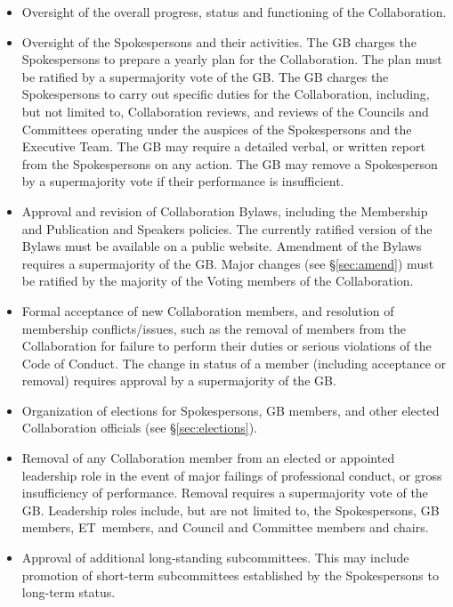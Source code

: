 \documentclass[12pt]{article}
\newcommand{\exec}{{Executive Team}}
\newcommand{\shorte}{{ET}}  %
\begin{document}
\begin{itemize}
\item Oversight of the overall progress, status and functioning of the Collaboration.

\item Oversight of the Spokespersons and their activities.  The GB charges the Spokespersons to prepare a yearly plan for the Collaboration.  The plan must be ratified by a supermajority vote of the GB.  The GB charges the Spokespersons to carry out specific duties for the Collaboration, including, but not limited to, Collaboration reviews, and reviews of the Councils and Committees operating under the auspices of the Spokespersons and the \exec.  The GB may require a detailed verbal, or written report from the Spokespersons on any action. The GB may remove a Spokesperson by a supermajority vote if their performance is insufficient.

\item Approval and revision of Collaboration Bylaws, including the Membership and Publication and Speakers policies. The currently ratified version of the Bylaws must be available on a public website. Amendment of the Bylaws requires a supermajority of the GB.  Major changes (see \S\ref{sec:amend}) must be ratified by the majority of the Voting members of the Collaboration.

\item Formal acceptance of new Collaboration members, and resolution of membership conflicts/issues, such as the removal of members from the Collaboration for failure to perform their duties or serious violations of the Code of Conduct. The change in status of a member (including acceptance or removal) requires approval by a supermajority of the GB.

\item Organization of elections for Spokespersons, GB members, and other elected Collaboration officials (see \S\ref{sec:elections}).

\item Removal of any Collaboration member from an elected or appointed leadership role in the event of major failings of professional conduct, or gross insufficiency of performance.  Removal requires a supermajority vote of the GB.   Leadership roles include, but are not limited to, the Spokespersons, GB members, \shorte\ members, and Council and Committee members and chairs.

\item Approval of additional long-standing subcommittees. This may include promotion of short-term subcommittees established by the Spokespersons to long-term status.

\end{itemize}
\end{document}
